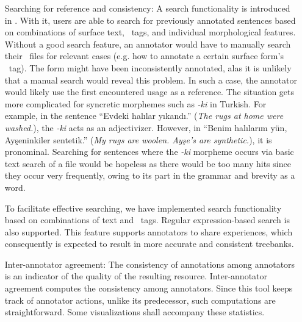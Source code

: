 \begin{itemize}[before=\normalfont, font=\itshape, align=left,noitemsep,topsep=0pt,parsep=3pt,partopsep=0pt,labelsep=3pt,align=left]
    \item[Searching for reference and consistency:]
        A search functionality is introduced in \boatvtwo.
        With it, users are able to search for previously annotated sentences based on combinations of surface text, \ud\ tags, and individual morphological features.
		Without a good search feature, an annotator would have to manually search their \conllu\ files for relevant cases (e.g. how to annotate a certain surface form's \upos\ tag).
		The form might have been inconsistently annotated, alas it is unlikely that a manual search would reveal this problem.
		In such a case, the annotator would likely use the first encountered usage as a reference.
        The situation gets more complicated for syncretic morphemes such as \textit{-ki} in Turkish.
        For example, in the sentence ``Evdeki halılar yıkandı.'' (\textit{The rugs at home were washed.}), the \textit{-ki} acts as an adjectivizer.
        However, in ``Benim halılarım yün, Ayşeninkiler sentetik.'' (\textit{My rugs are woolen. Ayşe's are synthetic.}), it is pronominal.
        Searching for sentences where the \textit{-ki} morpheme occurs via basic text search of a file would be hopeless as there would be too many hits since they occur very frequently, owing to its part in the grammar and brevity as a word.

        To facilitate effective searching, we have implemented search functionality based on combinations of text and \ud\ tags.
        Regular expression-based search is also supported.
        This feature supports annotators to share experiences, which consequently is expected to result in more accurate and consistent treebanks.

    \item[Inter-annotator agreement:]
        The consistency of annotations among annotators is an indicator of the quality of the resulting resource.
        Inter-annotator agreement computes the consistency among annotators.
        Since this tool keeps track of annotator actions, unlike its predecessor, such computations are straightforward.
        Some visualizations shall accompany these statistics.

\end{itemize}
